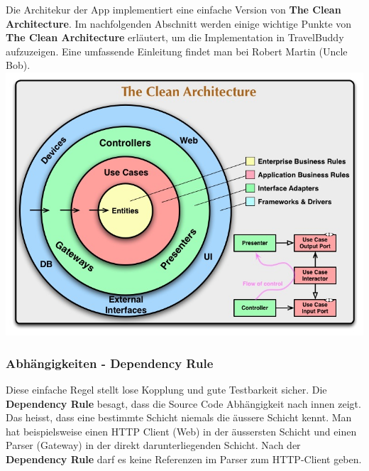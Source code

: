 \documentclass[a4paper,10pt,xetex]{article}
\begin{document}
Die Architekur der App implementiert eine einfache Version von \textbf{The Clean Architecture}. Im nachfolgenden Abschnitt werden einige wichtige Punkte von \textbf{The Clean Architecture} erläutert, um die Implementation in TravelBuddy aufzuzeigen. Eine umfassende Einleitung findet man bei Robert Martin (Uncle Bob).
{\includegraphics{cleanarchitecture}}
\subsubsection{Abhängigkeiten - Dependency Rule}\label{dependencyrule}
Diese einfache Regel stellt lose Kopplung und gute Testbarkeit sicher. Die \textbf{Dependency Rule} besagt, dass die Source Code Abhängigkeit nach innen zeigt. Das heisst, dass eine bestimmte Schicht niemals die äussere Schicht kennt. Man hat beispielsweise einen HTTP Client (Web) in der äussersten Schicht und einen Parser (Gateway) in der direkt darunterliegenden Schicht. Nach der \textbf{Dependency Rule} darf es keine Referenzen im Parser zum HTTP-Client geben.
\end{document}
